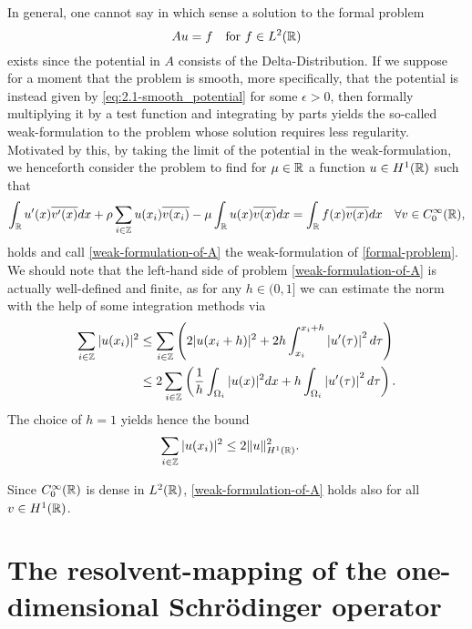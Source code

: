 In general, one cannot say in which sense a solution to the formal problem 
	\begin{equation}
		Au = f \quad \text{for } f \in L^{2}(\mathbb{R}) \label{formal-problem}
	\end{equation}
	exists since the potential in $A$ consists of the Delta-Distribution. If we suppose for a moment that the problem is smooth, more specifically, that the potential is instead given by \eqref{eq:2.1-smooth_potential} for some $\epsilon > 0$, then formally multiplying it by a test function and integrating by parts yields the so-called weak-formulation to the problem whose solution requires less regularity. Motivated by this, by taking the limit of the potential in the weak-formulation, we henceforth consider the problem to find for $\mu \in \mathbb{R}$ a function $u \in H^{1}(\mathbb{R})$ such that
\begin{equation}
	\int_{\mathbb{R}} u'(x) \overline{v'(x)} dx + \rho \sum_{i \in \mathbb{Z}} u(x_{i}) \overline{v(x_{i})} - \mu \int_{\mathbb{R}} u(x) \overline{v(x)} dx = \int_{\mathbb{R}} f(x) \overline{v(x)} dx \quad \forall v \in C_{0}^{\infty}(\mathbb{R}), \label{weak-formulation-of-A}
\end{equation}	
holds and call \eqref{weak-formulation-of-A} the weak-formulation of \eqref{formal-problem}. We should note that the left-hand side of problem \eqref{weak-formulation-of-A} is actually well-defined and finite, as for any $h \in (0, 1]$ we can estimate the norm with the help of some integration methods via
\begin{align}
	\sum_{i \in \mathbb{Z}} |u(x_{i})|^{2} & \leq \sum_{i \in \mathbb{Z}} \left( 2 |u( x_{i} + h )|^{2} +  2 h \int_{x_{i}}^{x_{i} + h} \left| u'(\tau) \right|^{2} d\tau \right) \notag \\
		 & \leq 2 \sum_{i \in \mathbb{Z}} \left( \frac{1}{h} \int_{\Omega_{i}} |u( x )|^{2} dx + h \int_{\Omega_{i}} \left| u'(\tau) \right|^{2} d\tau \right). \label{preestimation-for-potential}
\end{align}
The choice of $h = 1$ yields hence the bound
\begin{align} 
		\sum_{i \in \mathbb{Z}} |u(x_{i})|^{2} & \leq 2 \| u \|^{2}_{H^{1}(\mathbb{R})}. \label{estimation-for-potential}
\end{align}

\begin{remark}
	Since $C_{0}^{\infty}(\mathbb{R})$ is dense in $L^{2}(\mathbb{R})$, \eqref{weak-formulation-of-A} holds also for all $v \in H^{1}(\mathbb{R})$.
\end{remark}

\section{The resolvent-mapping of the one-dimensional Schrödinger operator} \label{sec:3.1}

